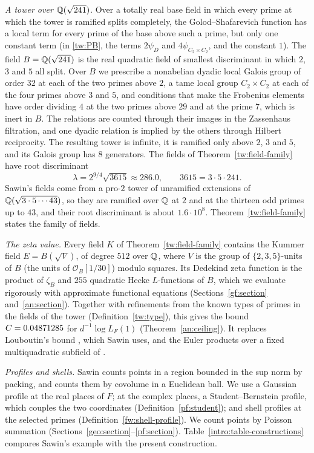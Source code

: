\emph{A tower over $\mathbb Q(\sqrt{241})$.} Over a totally real base field in
which every prime at which the tower is ramified splits completely, the
Golod--Shafarevich function has a local term for every prime of the
base above such a prime, but only one constant term (in
\eqref{tw:PB}, the terms $2\psi_D$ and $4\psi_{C_2\times C_2}$, and the
constant $1$). The field
$B=\mathbb Q(\sqrt{241})$ is the real quadratic field of smallest discriminant
in which $2$, $3$ and $5$ all split. Over $B$ we prescribe a nonabelian
dyadic local Galois group of order $32$ at each of the two primes above
$2$, a tame local group $C_2\times C_2$ at each of the four primes above
$3$ and $5$, and conditions that make the Frobenius elements have order
dividing $4$ at the two primes above $29$ and at the prime $7$, which is
inert in $B$. The relations are counted through their images in the
Zassenhaus filtration, and one dyadic relation is implied by the others
through Hilbert reciprocity. The resulting tower is infinite, it is
ramified only above $2$, $3$ and $5$, and its Galois group has $8$
generators. The fields of Theorem~\ref{tw:field-family} have root
discriminant
\[
 \lambda=2^{9/4}\sqrt{3615}\approx286.0,
 \qquad 3615=3\cdot5\cdot241.
\]
Sawin's fields come from a pro-$2$ tower of unramified extensions of
$\mathbb Q(\sqrt{3\cdot5\cdots43})$, so they are ramified over $\mathbb Q$ at $2$ and at
the thirteen odd primes up to $43$, and their root discriminant is about
$1.6\cdot10^8$. Theorem~\ref{tw:field-family}
states the family of fields.

\emph{The zeta value.} Every field $K$ of Theorem~\ref{tw:field-family}
contains the Kummer field $E=B(\sqrt V)$, of degree $512$ over $\mathbb Q$,
where $V$ is the group of $\{2,3,5\}$-units of $B$ (the units of
$\mathcal O_B[1/30]$) modulo squares. Its
Dedekind zeta function is the product of $\zeta_B$ and $255$ quadratic
Hecke $L$-functions of $B$, which we evaluate rigorously with approximate
functional equations (Sections~\ref{gf:section} and~\ref{an:section}).
Together with refinements from the known types of primes in the fields
of the tower (Definition~\ref{tw:type}), this gives the bound $C=0.04871285$ for $d^{-1}\log L_F(1)$
(Theorem~\ref{an:ceiling}). It replaces Louboutin's bound
\cite{Louboutin2000}, which Sawin uses, and the Euler products over a
fixed multiquadratic subfield of \cite{Naslund0358}.

\emph{Profiles and shells.} Sawin counts points in a region bounded in
the sup norm by packing, and \cite{Naslund0358} counts them by covolume
in a Euclidean ball. We use a Gaussian profile at the real places of
$F$; at the complex places, a Student--Bernstein profile, which couples
the two coordinates (Definition~\ref{pf:student}); and shell profiles at the selected primes
(Definition~\ref{fw:shell-profile}). We count points by Poisson
summation (Sections~\ref{geo:section}--\ref{pf:section}).
Table~\ref{intro:table-constructions} compares Sawin's example with the
present construction.

